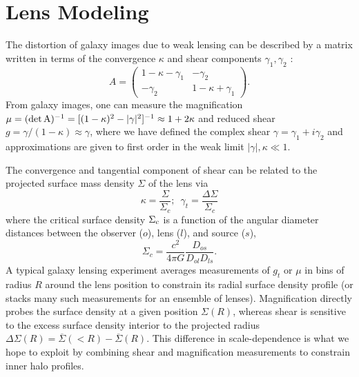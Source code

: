 \documentclass[12pt]{emulateapj}
\begin{document}
\section{Lens Modeling}
\label{sec:model}

The distortion of galaxy images due to weak lensing can be described
by a matrix written in terms of the convergence $\kappa$ and shear
components $\gamma_1, \gamma_2$ \citep[e.g.][]{Bartelmann2001}:
\begin{equation}
A = \left( \begin{array}{cc}
1 - \kappa -\gamma_1 & -\gamma_2 \\
-\gamma_2 & 1 - \kappa + \gamma_1 \end{array} \right).
\end{equation}
From galaxy images, one can measure the magnification 
$\mu = (\rm{det}\,A)^{-1} = [(1-\kappa)^2 - |\gamma|^2]^{-1} \approx 1+2\kappa$
and reduced shear $g = \gamma / (1-\kappa) \approx \gamma$, where we have defined the
complex shear $\gamma=\gamma_1 + i\gamma_2$ and approximations are
given to first order in the weak limit $|\gamma|,\kappa \ll 1$.

The convergence and tangential component of shear can be related to the
projected surface mass density $\Sigma$ of the lens via
\begin{equation}
\kappa = \frac{\Sigma}{\Sigma_c}; \,\,\, \gamma_t = \frac{\Delta\Sigma}{\Sigma_c}
\end{equation}
where the critical surface density $\Sigma_{\rm  c}$ is a function of
the angular diameter distances between the observer ($o$), lens ($l$),
and source ($s$),
\begin{equation}
\Sigma_{c}=\frac{c^2}{4\pi G}\frac{D_{os}}{D_{ol}D_{ls}}.
\end{equation}
A typical galaxy lensing experiment averages measurements of $g_t$ or $\mu$ in
bins of radius $R$ around the lens position to constrain its radial
surface density profile (or stacks many such measurements for an
ensemble of lenses). Magnification directly probes the surface density
at a given position $\Sigma(R)$, whereas shear is sensitive to the
excess surface density interior to the projected radius
$\Delta\Sigma(R) = \overline{\Sigma}(<R) - \overline{\Sigma}(R)$. This
difference in scale-dependence is what we hope to exploit by combining
shear and magnification measurements to constrain inner halo profiles.
\end{document}
